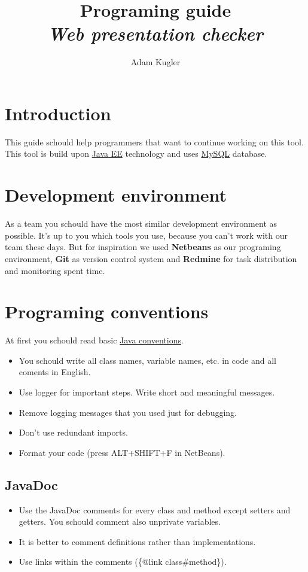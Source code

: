 \documentclass[12pt,a4paper]{article}
\author{Adam Kugler}
\title{Programing guide\\\textit{Web presentation checker}}
\begin{document}
\maketitle
\tableofcontents
\newpage

\section {Introduction}
This guide schould help programmers that want to continue working on this tool. This tool is build upon
\href{http://www.oracle.com/technetwork/java/javaee/overview/index.html}{Java EE} technology and uses \href{http://www.mysql.com/}{MySQL} database.

\section {Development environment}
As a team you schould have the most similar development environment as possible. It's up to you which tools you use, because you can't work with our team these days. But for inspiration we used \textbf{Netbeans} as our programing environment, \textbf{Git} as version control system and \textbf{Redmine} for task distribution and monitoring spent time.

\section{Programing conventions}
At first you schould read basic \href{http://www.oracle.com/technetwork/java/codeconvtoc-136057.html}{Java conventions}.
\begin{itemize}
\item You schould write all class names, variable names, etc. in code and all coments in English.
\item Use logger for important steps. Write short and meaningful messages.
\item Remove logging messages that you used just for debugging.
\item Don't use redundant imports.
\item Format your code (press ALT+SHIFT+F in NetBeans).
\end{itemize}
\subsection{JavaDoc}
\begin{itemize}
\item Use the JavaDoc comments for every class and method except setters and getters. You schould comment also unprivate variables.
\item It is better to comment definitions rather than implementations.
\item Use links within the comments (\{@link class\#method\}).
\end{itemize}
\end{document}
